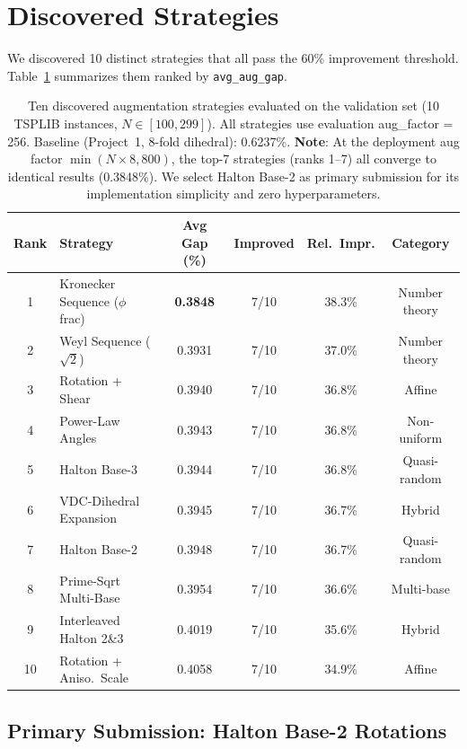 \documentclass[11pt,a4paper]{article}
\begin{document}
\section{Discovered Strategies}
\label{sec:strategies}

We discovered 10 distinct strategies that all pass the 60\% improvement
threshold. Table~\ref{tab:methods} summarizes them ranked by
\texttt{avg\_aug\_gap}.

\begin{table}[h]
\centering
\caption{Ten discovered augmentation strategies evaluated on the validation set
(10 TSPLIB instances, $N \in [100, 299]$). All strategies use evaluation
aug\_factor = 256. Baseline (Project~1, 8-fold dihedral): 0.6237\%.
\textbf{Note}: At the deployment aug factor $\min(N{\times}8, 800)$, the top-7
strategies (ranks 1--7) all converge to identical results (0.3848\%). We select
Halton Base-2 as primary submission for its implementation simplicity and
zero hyperparameters.}
\label{tab:methods}
\small
\begin{tabular}{@{}clcccc@{}}
\toprule
\textbf{Rank} & \textbf{Strategy} & \textbf{Avg Gap (\%)} & \textbf{Improved} & \textbf{Rel.\ Impr.} & \textbf{Category} \\
\midrule
1 & Kronecker Sequence ($\phi$ frac) & \textbf{0.3848} & 7/10 & 38.3\% & Number theory \\
2 & Weyl Sequence ($\sqrt{2}$) & 0.3931 & 7/10 & 37.0\% & Number theory \\
3 & Rotation + Shear & 0.3940 & 7/10 & 36.8\% & Affine \\
4 & Power-Law Angles & 0.3943 & 7/10 & 36.8\% & Non-uniform \\
5 & Halton Base-3 & 0.3944 & 7/10 & 36.8\% & Quasi-random \\
6 & VDC-Dihedral Expansion & 0.3945 & 7/10 & 36.7\% & Hybrid \\
7 & Halton Base-2 & 0.3948 & 7/10 & 36.7\% & Quasi-random \\
8 & Prime-Sqrt Multi-Base & 0.3954 & 7/10 & 36.6\% & Multi-base \\
9 & Interleaved Halton 2\&3 & 0.4019 & 7/10 & 35.6\% & Hybrid \\
10 & Rotation + Aniso.\ Scale & 0.4058 & 7/10 & 34.9\% & Affine \\
\bottomrule
\end{tabular}
\end{table}

\subsection{Primary Submission: Halton Base-2 Rotations}
\end{document}
